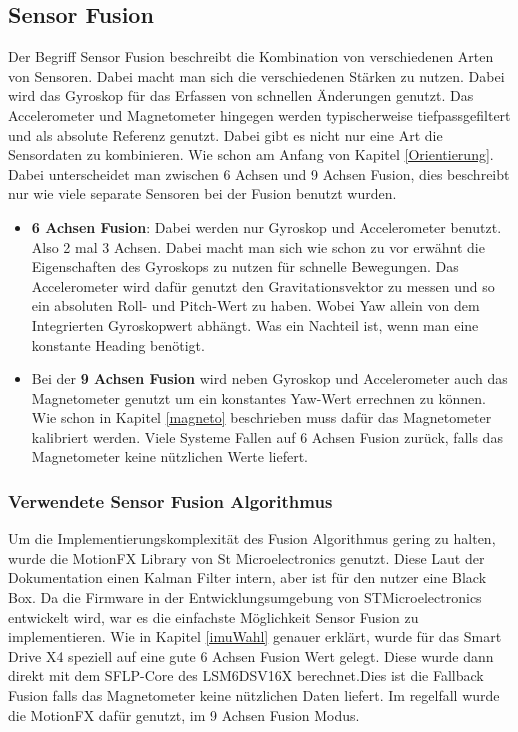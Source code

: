 \subsection{Sensor Fusion}
Der Begriff Sensor Fusion beschreibt die Kombination von verschiedenen Arten von Sensoren. Dabei macht man sich die verschiedenen Stärken zu nutzen. Dabei wird das Gyroskop für das Erfassen von schnellen Änderungen genutzt. Das Accelerometer und Magnetometer hingegen werden typischerweise tiefpassgefiltert und als absolute Referenz genutzt. Dabei gibt es nicht nur eine Art die Sensordaten zu kombinieren. Wie schon am Anfang von Kapitel \ref{Orientierung}. Dabei unterscheidet man zwischen 6 Achsen und 9 Achsen Fusion, dies beschreibt nur wie viele separate Sensoren bei der Fusion benutzt wurden.
\begin{itemize}
    \item \textbf{6 Achsen Fusion}: Dabei werden nur Gyroskop und Accelerometer benutzt. Also 2 mal 3 Achsen. Dabei macht man sich wie schon zu vor erwähnt die Eigenschaften des Gyroskops zu nutzen für schnelle Bewegungen. Das Accelerometer wird dafür genutzt den Gravitationsvektor zu messen und so ein absoluten Roll- und Pitch-Wert zu haben. Wobei Yaw allein von dem Integrierten Gyroskopwert abhängt. Was ein Nachteil ist, wenn man eine konstante Heading benötigt.
    \item Bei der \textbf{9 Achsen Fusion} wird neben Gyroskop und Accelerometer auch das Magnetometer genutzt um ein konstantes Yaw-Wert errechnen zu können. Wie schon in Kapitel \ref{magneto} beschrieben muss dafür das Magnetometer kalibriert werden. Viele Systeme Fallen auf 6 Achsen Fusion zurück, falls das Magnetometer keine nützlichen Werte liefert. 
\end{itemize}

\subsubsection{Verwendete Sensor Fusion Algorithmus}
Um die Implementierungskomplexität des Fusion Algorithmus gering zu halten,
wurde die MotionFX Library von St Microelectronics \cite{st_motionFX} genutzt.
Diese Laut der Dokumentation einen Kalman Filter intern, aber ist für den nutzer
eine Black Box. Da die Firmware in der Entwicklungsumgebung von
STMicroelectronics entwickelt wird, war es die einfachste Möglichkeit Sensor Fusion zu implementieren. Wie in Kapitel \ref{imuWahl} genauer erklärt, wurde für das Smart Drive X4 speziell auf eine gute 6 Achsen Fusion Wert gelegt. Diese wurde dann direkt mit dem SFLP-Core des LSM6DSV16X berechnet.Dies ist die Fallback Fusion falls das Magnetometer keine nützlichen Daten liefert. Im regelfall wurde die MotionFX dafür genutzt, im 9 Achsen Fusion Modus.\\
\newpage
